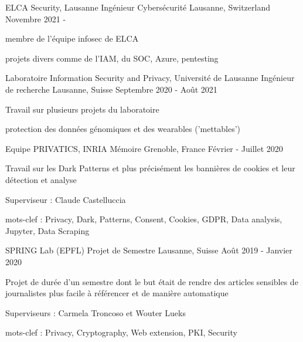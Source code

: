 


\begin{cventries}
	
\cventry
{ELCA Security, Lausanne} %
{Ingénieur Cybersécurité} %
{Lausanne, Switzerland} %
{Novembre 2021 - } %
{ %
	\begin{cvitems}
		\item {membre de l'équipe infosec de ELCA}
		\item {projets divers comme de l'IAM, du SOC, Azure, pentesting}
	\end{cvitems}
}
	
\cventry
{Laboratoire Information Security and Privacy, Université de Lausanne} %
{Ingénieur de recherche} %
{Lausanne, Suisse} %
{Septembre 2020 - Août 2021} %
{ %
	\begin{cvitems}
		\item {Travail sur plusieurs projets du laboratoire}
		\item {protection des données génomiques et des wearables ('mettables')}
	\end{cvitems}
}
	
\cventry
{Equipe PRIVATICS, INRIA} %
{Mémoire} %
{Grenoble, France} %
{Février - Juillet 2020} %
{ %
	\begin{cvitems}
		\item {Travail sur les Dark Patterns et plus précisément les bannières de cookies et leur détection et analyse}
		\item {Superviseur : Claude Castelluccia}
		\item {mots-clef : Privacy, Dark, Patterns, Consent, Cookies, GDPR, Data analysis, Jupyter, Data Scraping}
	\end{cvitems}
}

\cventry
{SPRING Lab (EPFL)} %
{Projet de Semestre} %
{Lausanne, Suisse} %
{Août 2019 - Janvier 2020} %
{ %
	\begin{cvitems}
		\item {Projet de durée d'un semestre dont le but était de rendre des articles sensibles de journalistes plus facile à référencer et de manière automatique}
		\item {Superviseurs : Carmela Troncoso et Wouter Lueks}
		\item {mots-clef : Privacy, Cryptography, Web extension, PKI, Security}
	\end{cvitems}
}


\end{cventries}
